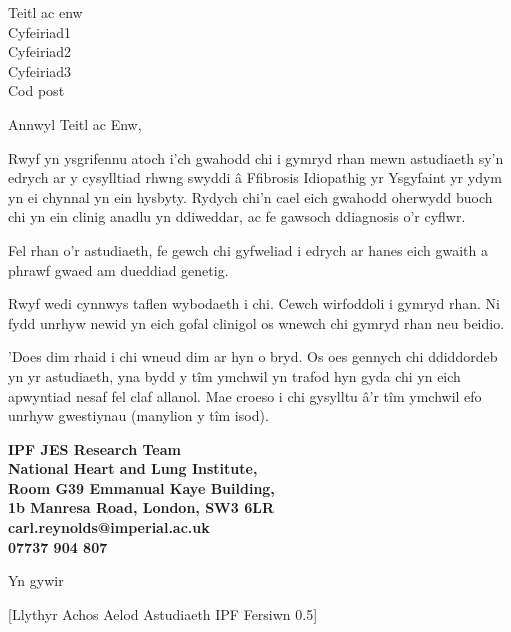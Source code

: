 \documentclass[ipfjes-centre-welsh,letterpaper,pagesize,UScommercial9]{scrlttr2}
\begin{document}
\begin{letter}{Teitl ac enw\\ Cyfeiriad1 \\ Cyfeiriad2 \\ Cyfeiriad3 \\ Cod post}


\opening{Annwyl Teitl ac Enw,}

     Rwyf yn ysgrifennu atoch i'ch gwahodd chi i gymryd rhan mewn astudiaeth sy'n edrych ar y cysylltiad rhwng swyddi \^{a} Ffibrosis Idiopathig yr Ysgyfaint yr ydym yn ei chynnal yn ein hysbyty. Rydych chi'n cael eich gwahodd oherwydd buoch chi yn ein clinig anadlu yn ddiweddar, ac fe gawsoch ddiagnosis o'r cyflwr.
     
     Fel rhan o'r astudiaeth, fe gewch chi gyfweliad i edrych ar hanes eich gwaith a phrawf gwaed am dueddiad genetig.
     
    Rwyf wedi cynnwys taflen wybodaeth i chi. Cewch wirfoddoli i gymryd rhan. Ni fydd unrhyw newid yn eich gofal clinigol os wnewch chi gymryd rhan neu beidio. 
    
    'Does dim rhaid i chi wneud dim ar hyn o bryd. Os oes gennych chi ddiddordeb yn yr astudiaeth, yna bydd y t\^{i}m ymchwil yn trafod hyn gyda chi yn eich apwyntiad nesaf fel claf allanol.
     Mae croeso i chi gysylltu \^{a}'r t\^{i}m ymchwil efo unrhyw gwestiynau (manylion y t\^{i}m isod). 

    \vspace{1cm}
    \begin{centering}
    \textbf{
    IPF JES Research Team \\  
    National Heart and Lung Institute, \\
    Room G39 Emmanual Kaye Building, \\
    1b Manresa Road, London, SW3 6LR\\
    carl.reynolds@imperial.ac.uk \\
    07737 904 807 \\
    }
    \end{centering}
    \vspace{1cm}

\closing{Yn gywir}

     \vfill \hfill [Llythyr Achos Aelod Astudiaeth IPF Fersiwn 0.5]


\end{letter}
\end{document}
